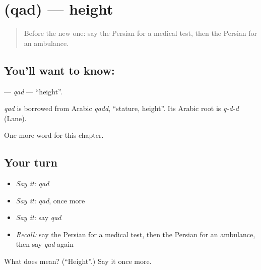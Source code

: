 \section[\texorpdfstring{\fa{قد} (qad)}{قد (qad)}]{ (qad) — height}

\label{lesson:FA-C189-qad}



\begin{quote}
Before the new one: say the Persian for a medical test, then the Persian for an ambulance.
\end{quote}

\subsection*{You'll want to know: }
\textbf{} — \emph{qad} — \textquotedblleft{}height\textquotedblright{}.

\begin{cousinweb}
\emph{qad} is borrowed from Arabic \emph{qadd}, \textquotedblleft{}stature, height\textquotedblright{}. Its Arabic root is \emph{q-d-d} (Lane).
\end{cousinweb}

\begin{grammarlens}[title={What you've built}]
One more word for this chapter.
\end{grammarlens}

\subsection*{Your turn}
\begin{itemize}
\raggedright
  \item \emph{Say it:} \emph{qad}
  \item \emph{Say it:} \emph{qad}, once more
  \item \emph{Say it:} say \emph{qad}
  \item \emph{Recall:} say the Persian for a medical test, then the Persian for an ambulance, then say \emph{qad} again
\end{itemize}

\begin{tcolorbox}[breakable,colback=teal!4,colframe=teal!35!black,title={Before you move on}]
What does  mean? (\textquotedblleft{}Height\textquotedblright{}.) Say it once more.
\end{tcolorbox}
